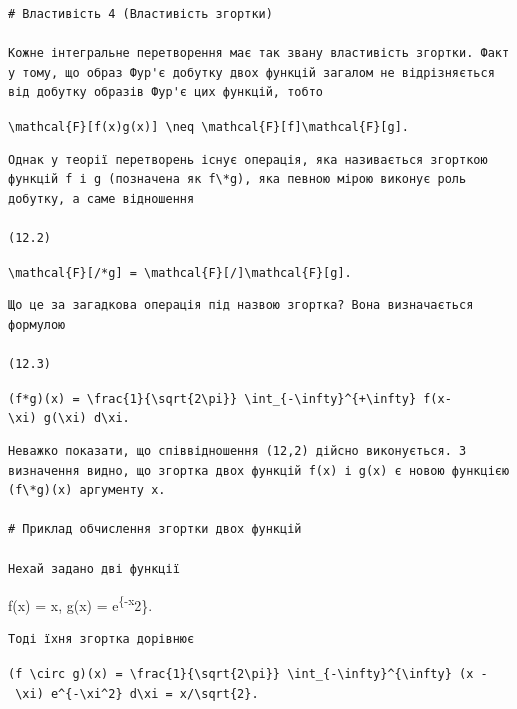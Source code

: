 \documentclass[
  ukrainian,
]{article}
\begin{document}
\begin{verbatim}
# Властивість 4 (Властивість згортки)

Кожне інтегральне перетворення має так звану властивість згортки. Факт у тому, що образ Фур'є добутку двох функцій загалом не відрізняється від добутку образів Фур'є цих функцій, тобто
\end{verbatim}

\texttt{\textbackslash{}mathcal\{F\}{[}f(x)g(x){]}\ \textbackslash{}neq\ \textbackslash{}mathcal\{F\}{[}f{]}\textbackslash{}mathcal\{F\}{[}g{]}.}

\begin{verbatim}
Однак у теорії перетворень існує операція, яка називається згорткою функцій f і g (позначена як f\*g), яка певною мірою виконує роль добутку, а саме відношення

(12.2)
\end{verbatim}

\texttt{\textbackslash{}mathcal\{F\}{[}/*g{]}\ =\ \textbackslash{}mathcal\{F\}{[}/{]}\textbackslash{}mathcal\{F\}{[}g{]}.}

\begin{verbatim}
Що це за загадкова операція під назвою згортка? Вона визначається формулою

(12.3)
\end{verbatim}

\texttt{(f*g)(x)\ =\ \textbackslash{}frac\{1\}\{\textbackslash{}sqrt\{2\textbackslash{}pi\}\}\ \textbackslash{}int\_\{-\textbackslash{}infty\}\^{}\{+\textbackslash{}infty\}\ f(x-\textbackslash{}xi)\ g(\textbackslash{}xi)\ d\textbackslash{}xi.}

\begin{verbatim}
Неважко показати, що співвідношення (12,2) дійсно виконується. З визначення видно, що згортка двох функцій f(x) і g(x) є новою функцією (f\*g)(x) аргументу x.

# Приклад обчислення згортки двох функцій

Нехай задано дві функції
\end{verbatim}

f(x) = x, g(x) = e\textsuperscript{\{-x}2\}.

\begin{verbatim}
Тоді їхня згортка дорівнює
\end{verbatim}

\texttt{(f\ \textbackslash{}circ\ g)(x)\ =\ \textbackslash{}frac\{1\}\{\textbackslash{}sqrt\{2\textbackslash{}pi\}\}\ \textbackslash{}int\_\{-\textbackslash{}infty\}\^{}\{\textbackslash{}infty\}\ (x\ -\ \textbackslash{}xi)\ e\^{}\{-\textbackslash{}xi\^{}2\}\ d\textbackslash{}xi\ =\ x/\textbackslash{}sqrt\{2\}.}
\end{document}
